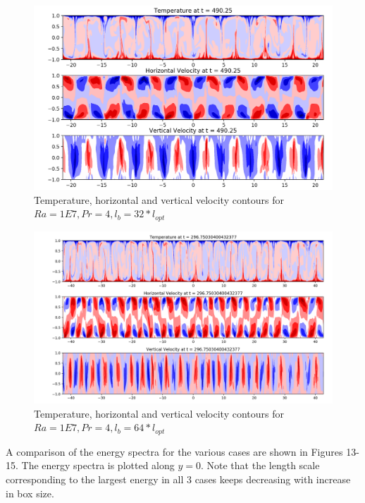 \documentclass[12pt]{article}
\begin{document}
   \begin{figure}[!htb]
   	\includegraphics[width=\linewidth]{contours_1E7_4_32.png}
   	\caption{Temperature, horizontal and vertical velocity contours for $Ra = 1E7, Pr =4, l_b = 32* l_{opt} $ }
   	\label{fig:fig12}
   \end{figure}

 \begin{figure}[!htb]
 	\includegraphics[width=\linewidth]{contours_1E7_4_64.png}
 	\caption{Temperature, horizontal and vertical velocity contours for $Ra = 1E7, Pr =4, l_b = 64* l_{opt} $ }
 	\label{fig:fig12}
 \end{figure}

A comparison of the energy spectra for the various cases are shown in Figures 13-15. The energy spectra is plotted along $y = 0$. Note that the length scale corresponding to the largest energy in all 3 cases keeps decreasing with increase in box size.
\end{document}
